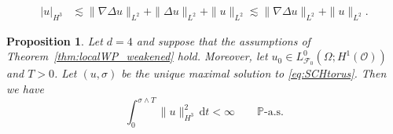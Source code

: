 \documentclass[10pt,a4paper]{amsart}
\newtheorem{proposition}{Proposition}
\newcommand{\F}{\mathscr{F}}
\newcommand{\dt}{\,\mathrm{d}t}
\newcommand{\grad}{\nabla}
\newcommand{\sO}{\mathscr{O}}
\begin{document}
\begin{align}
    |u|_{H^3} &\lesssim \|\grad \Delta u\|_{L^2}+\|\Delta u\|_{L^2}+\|u\|_{L^2} \lesssim \|\grad \Delta u\|_{L^2}+\|u\|_{L^2}.\label{eq:ellReg_H3_seminorm}
\end{align}

\begin{proposition} \label{prop:global_well_posedness_dim_4-part2}
	Let $d=4$ and suppose that the assumptions of Theorem~\ref{thm:localWP_weakened} hold. Moreover, let $u_0\in L^0_{\F_0}(\Omega;H^1(\sO))$ and $T>0$. Let $(u,\sigma)$ be the unique maximal solution to \eqref{eq:SCHtorus}. Then we have
	\begin{equation}\label{eq:thm-global_well_posedness_dim_4-claim1}
	  \int_0^{\sigma\wedge T} \|u\|^2_{H^3} \dt < \infty  \qquad \mathbb{P}\text{-a.s.}
	\end{equation}
\end{proposition}
\end{document}
